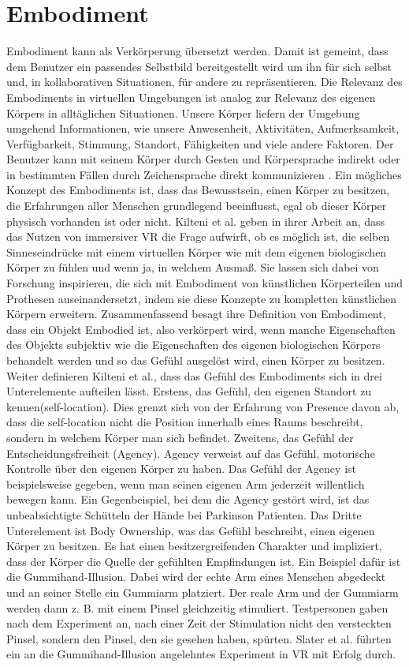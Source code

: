 \section{Embodiment}
Embodiment kann als Verkörperung übersetzt werden. Damit ist gemeint, dass dem Benutzer ein passendes Selbstbild bereitgestellt wird um ihn für sich selbst und, in kollaborativen Situationen, für andere zu repräsentieren. Die Relevanz des Embodiments in virtuellen Umgebungen ist analog zur Relevanz des eigenen Körpers in alltäglichen Situationen. Unsere Körper liefern der Umgebung umgehend Informationen, wie unsere Anwesenheit, Aktivitäten, Aufmerksamkeit, Verfügbarkeit, Stimmung, Standort, Fähigkeiten und viele andere Faktoren. Der Benutzer kann mit seinem Körper durch Gesten und Körpersprache indirekt oder in bestimmten Fällen durch Zeichensprache direkt kommunizieren  \cite{Benford2010}.
Ein mögliches Konzept des Embodiments ist, dass das Bewusstsein, einen Körper zu besitzen, die Erfahrungen aller Menschen grundlegend beeinflusst, egal ob dieser Körper physisch vorhanden ist oder nicht.\cite{Tham2018} Kilteni et al. \cite{Kilteni2012} geben in ihrer Arbeit an, dass das Nutzen von immersiver VR die Frage aufwirft, ob es möglich ist, die selben Sinneseindrücke mit einem virtuellen Körper wie mit dem eigenen biologischen Körper zu fühlen und wenn ja, in welchem Ausmaß. Sie lassen sich  dabei von Forschung inspirieren, die sich mit Embodiment von künstlichen Körperteilen und Prothesen auseinandersetzt, indem sie diese Konzepte zu kompletten künstlichen Körpern erweitern. Zusammenfassend besagt ihre Definition von Embodiment, dass ein Objekt Embodied ist, also verkörpert wird, wenn manche Eigenschaften des Objekts subjektiv wie die Eigenschaften des eigenen biologischen Körpers behandelt werden und so das Gefühl ausgelöst wird, einen Körper zu besitzen.
Weiter definieren Kilteni et al., dass das Gefühl des Embodiments sich in drei Unterelemente aufteilen lässt. Erstens, das Gefühl, den eigenen Standort zu kennen(self-location).  Dies grenzt sich von der Erfahrung von Presence davon ab, dass die self-location nicht die Position innerhalb eines Raums beschreibt, sondern in welchem Körper man sich befindet. Zweitens, das Gefühl der Entscheidungsfreiheit (Agency). Agency verweist auf das Gefühl, motorische Kontrolle über den eigenen Körper zu haben. Das Gefühl der Agency ist beispielsweise gegeben, wenn man seinen eigenen Arm jederzeit willentlich bewegen kann. Ein Gegenbeispiel, bei dem die Agency gestört wird, ist das unbeabsichtigte Schütteln der Hände bei Parkinson Patienten. Das Dritte Unterelement ist Body Ownership, was das Gefühl beschreibt, einen eigenen Körper zu besitzen. Es hat einen besitzergreifenden Charakter und impliziert, dass der Körper die Quelle der gefühlten Empfindungen ist. Ein Beispiel dafür ist die Gummihand-Illusion. Dabei wird der echte Arm eines Menschen abgedeckt und an seiner Stelle ein Gummiarm platziert. Der reale Arm und der Gummiarm werden dann z. B. mit einem Pinsel gleichzeitig stimuliert. Testpersonen gaben nach dem Experiment an, nach einer Zeit der Stimulation nicht den versteckten Pinsel, sondern den Pinsel, den sie gesehen haben, spürten.\cite{Botvinick1998} Slater et al. \cite{Slater2008} führten ein an die Gummihand-Illusion angelehntes Experiment in VR mit Erfolg durch.


